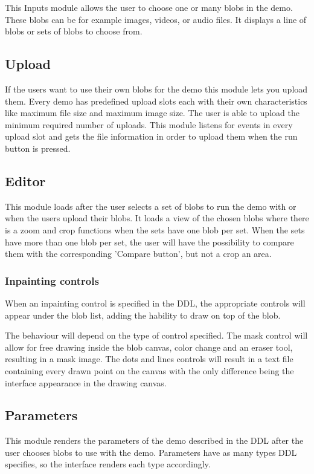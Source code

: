 This Inputs module allows the user to choose one or many blobs in the demo. These blobs can be for example images, videos, or audio files. It displays a line of blobs or sets of blobs to choose from.


\subsection{Upload}
If the users want to use their own blobs for the demo this module lets you upload them. Every demo has predefined 
upload slots each with their own characteristics like maximum file size and maximum image size. The user is able to upload the 
minimum required number of uploads. This module listens for events in every upload slot and gets the file information in order to 
upload them when the run button is pressed.


\subsection{Editor}
This module loads after the user selects a set of blobs to run the demo with or when the users upload their blobs. It loads a view of
the chosen blobs where there is a zoom and crop functions when the sets have one blob per set. When the sets have more than 
one blob per set, the user will have the possibility to compare them with the corresponding 'Compare button', but not a crop 
an area.

\subsubsection{Inpainting controls}
When an inpainting control is specified in the DDL, the appropriate controls will appear under the blob list, adding the hability to draw on top of the blob. 

The behaviour will depend on the type of control specified. The mask control will allow for free drawing inside the blob canvas, color change and an eraser tool, resulting in a mask image. The dots and lines controls will result in a text file containing every drawn point on the canvas with the only difference being the interface appearance in the drawing canvas. 

\subsection{Parameters}
This module renders the parameters of the demo described in the DDL after the user chooses blobs to use with the demo. 
Parameters have as many types DDL specifies, so the interface renders each type accordingly.

